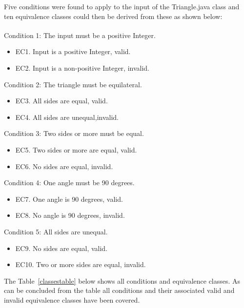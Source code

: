 Five conditions were found to apply to the input of the Triangle.java class and ten equivalence classes could then be derived from these as shown below: \\\\
\noindent Condition 1: The input must be a positive Integer.
\begin{itemize}
	\item EC1. Input is a positive Integer, valid.
	\item EC2. Input is a non-positive Integer, invalid.
\end{itemize}

\noindent Condition 2: The triangle must be equilateral.
\begin{itemize}
	\item EC3. All sides are equal, valid. 
	\item EC4. All sides are unequal,invalid. 
\end{itemize}

\noindent Condition 3: Two sides or more must be equal.  
\begin{itemize}
	\item EC5. Two sides or more are equal, valid. 
	\item EC6. No sides are equal, invalid. 
\end{itemize}

\noindent Condition 4: One angle must be 90 degrees. 
\begin{itemize}
	\item EC7. One angle is 90 degrees, valid. 
	\item EC8. No angle is 90 degrees, invalid. 
\end{itemize}

\noindent Condition 5: All sides are unequal. 
\begin{itemize}
	\item EC9. No sides are equal, valid. 
	\item EC10. Two or more sides are equal, invalid. 
\end{itemize}

\noindent The Table~\ref{classestable} below shows all conditions and equivalence classes. As can be concluded from the table all conditions and their associated valid and invalid equivalence classes have been covered.



